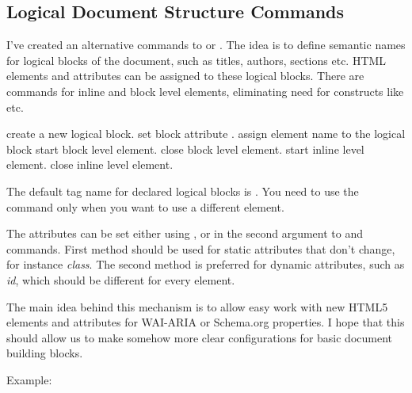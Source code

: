 

\subsection{Logical Document Structure Commands}
I've created an alternative commands to  or . 
The idea is to define semantic names for logical blocks of the document, such as titles, authors,
sections etc. HTML elements and attributes can be assigned to these
logical blocks. There are commands for inline and block level elements,
eliminating need for constructs like \texcommand{\ifvmode\IgnorePar\fi\EndP}
etc.

 create a new logical block.
 set block attribute .
 assign element name to the logical block
 start block level element.
 close block level element.
 start inline level element.
 close inline level element.


The default tag name for declared logical blocks is . You
need to use the  command only when you want to use a different
element.

The attributes can be set either using , or in the second
argument to   and  commands. First method should be
used for static attributes that don't change, for instance \textit{class}. The second method
is preferred for dynamic attributes, such as \textit{id}, which should be different for 
every element.

The main idea behind this mechanism is to allow easy work with new HTML5
elements and attributes for WAI-ARIA or Schema.org properties. I hope that
this should allow us to make somehow more clear configurations for basic
document building blocks.

Example:


